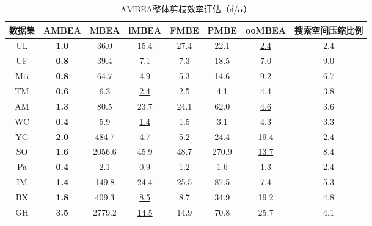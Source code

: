 \begin{table} [H]
	\centering    
	\setlength{\abovecaptionskip}{0cm}  
  \setlength{\belowcaptionskip}{-0.1cm}
	\caption{AMBEA整体剪枝效率评估（$\delta/\alpha$）}      
	\label{tbl:ambea_prune}
	\setlength{\tabcolsep}{5pt}
	\begin{center}
				\normalsize{
		\begin{tabular}{|c|c|c|c|c|c|c|c|}
			\hline 

      \textbf{数据集} & \textbf{AMBEA} & \textbf{MBEA} & \textbf{iMBEA} & \textbf{FMBE} & \textbf{PMBE} & \textbf{ooMBEA} & \textbf{搜索空间压缩比例} \\ \hline
      UL & \textbf{1.0} & 36.0 & 15.4 & 27.4 & 22.1 & \uline{2.4} & 2.4\\
      UF & \textbf{0.8} & 39.4 & 7.1 & 7.3 & 18.5 & \uline{7.0} & 9.0\\
      Mti & \textbf{0.8} & 64.7 & 4.9 & 5.3 & 14.6 & \uline{9.2} & 6.7\\
      TM & \textbf{0.6} & 6.3 & \uline{2.4} & 2.5 & 4.1 & 4.4 & 3.8\\
      AM & \textbf{1.3} & 80.5 & 23.7 & 24.1 & 62.0 & \uline{4.6} &3.6 \\
      WC & \textbf{0.4} & 5.9 & \uline{1.4} & 1.5 & 3.1 & 4.3 & 3.3\\
      YG & \textbf{2.0} & 484.7 & \uline{4.7} & 5.2 & 24.4 & 19.4 &2.4\\
      SO & \textbf{1.6} & 2056.6 & 45.9 & 48.7 & 270.9 & \uline{13.7} & 8.4\\
      Pa & \textbf{0.4} & 2.1 & \uline{0.9} & 1.2 & 1.6 & 1.3 &2.4\\
      IM & \textbf{1.4} & 149.8 & 24.4 & 25.5 & 87.5 & \uline{7.4} &5.3\\
      BX & \textbf{1.8} & 409.3 & \uline{8.5} & 8.7 & 34.9 & 19.2 &4.8\\
      GH & \textbf{3.5} & 2779.2 & \uline{14.5} & 14.9 & 70.8 & 25.7 &4.1\\ \hline
		\end{tabular}
				}
	\end{center}

\end{table}
